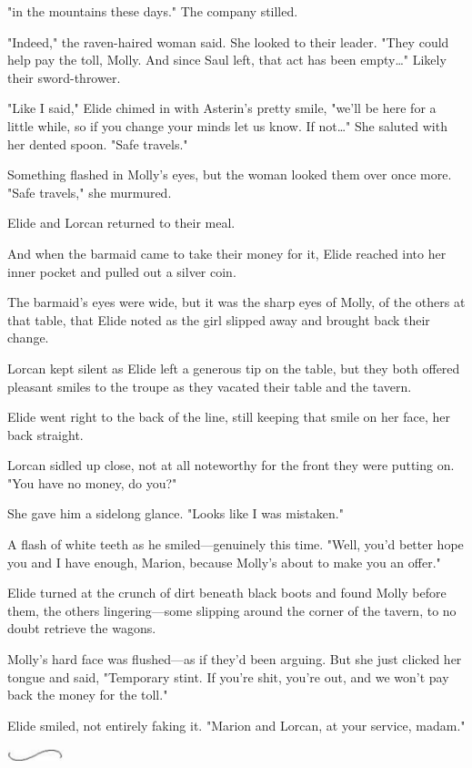 "in the mountains these days." The company stilled.

"Indeed," the raven-haired woman said. She looked to their leader. "They could help pay the toll, Molly. And since Saul left, that act has been empty\ldots" Likely their sword-thrower.

"Like I said," Elide chimed in with Asterin's pretty smile, "we'll be here for a little while, so if you change your minds  let us know. If not\ldots" She saluted with her dented spoon. "Safe travels."

Something flashed in Molly's eyes, but the woman looked them over once more. "Safe travels," she murmured.

Elide and Lorcan returned to their meal.

And when the barmaid came to take their money for it, Elide reached into her inner pocket and pulled out a silver coin.

The barmaid's eyes were wide, but it was the sharp eyes of Molly, of the others at that table, that Elide noted as the girl slipped away and brought back their change.

Lorcan kept silent as Elide left a generous tip on the table, but they both offered pleasant smiles to the troupe as they vacated their table and the tavern.

Elide went right to the back of the line, still keeping that smile on her face, her back straight.

Lorcan sidled up close, not at all noteworthy for the front they were putting on. "You have no money, do you?"

She gave him a sidelong glance. "Looks like I was mistaken."

A flash of white teeth as he smiled---genuinely this time. "Well, you'd better hope you and I have enough, Marion, because Molly's about to make you an offer."

Elide turned at the crunch of dirt beneath black boots and found Molly before them, the others lingering---some slipping around the corner of the tavern, to no doubt retrieve the wagons.

Molly's hard face was flushed---as if they'd been arguing. But she just clicked her tongue and said, "Temporary stint. If you're shit, you're out, and we won't pay back the money for the toll."

Elide smiled, not entirely faking it. "Marion and Lorcan, at your service, madam."

\includegraphics[width=0.65in,height=0.13in]{images/seperator}

